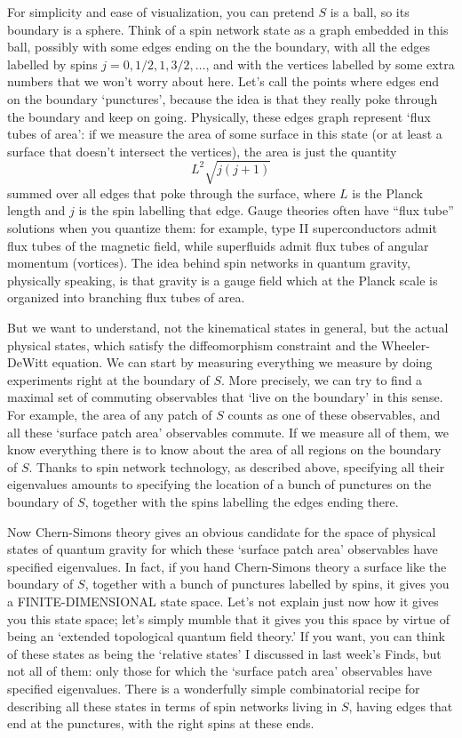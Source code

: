 \documentclass{article}
\begin{document}
For simplicity and ease of visualization, you can pretend \(S\) is a
ball, so its boundary is a sphere. Think of a spin network state as a
graph embedded in this ball, possibly with some edges ending on the the
boundary, with all the edges labelled by spins
\(j = 0,1/2,1,3/2,\ldots\), and with the vertices labelled by some extra
numbers that we won't worry about here. Let's call the points where
edges end on the boundary `punctures', because the idea is that they
really poke through the boundary and keep on going. Physically, these
edges graph represent `flux tubes of area': if we measure the area of
some surface in this state (or at least a surface that doesn't intersect
the vertices), the area is just the quantity \[L^2  \sqrt{j(j+1)}\]
summed over all edges that poke through the surface, where \(L\) is the
Planck length and \(j\) is the spin labelling that edge. Gauge theories
often have ``flux tube'' solutions when you quantize them: for example,
type II superconductors admit flux tubes of the magnetic field, while
superfluids admit flux tubes of angular momentum (vortices). The idea
behind spin networks in quantum gravity, physically speaking, is that
gravity is a gauge field which at the Planck scale is organized into
branching flux tubes of area.

But we want to understand, not the kinematical states in general, but
the actual physical states, which satisfy the diffeomorphism constraint
and the Wheeler-DeWitt equation. We can start by measuring everything we
measure by doing experiments right at the boundary of \(S\). More
precisely, we can try to find a maximal set of commuting observables
that `live on the boundary' in this sense. For example, the area of any
patch of \(S\) counts as one of these observables, and all these
`surface patch area' observables commute. If we measure all of them, we
know everything there is to know about the area of all regions on the
boundary of \(S\). Thanks to spin network technology, as described
above, specifying all their eigenvalues amounts to specifying the
location of a bunch of punctures on the boundary of \(S\), together with
the spins labelling the edges ending there.

Now Chern-Simons theory gives an obvious candidate for the space of
physical states of quantum gravity for which these `surface patch area'
observables have specified eigenvalues. In fact, if you hand
Chern-Simons theory a surface like the boundary of \(S\), together with
a bunch of punctures labelled by spins, it gives you a
FINITE-DIMENSIONAL state space. Let's not explain just now how it gives
you this state space; let's simply mumble that it gives you this space
by virtue of being an `extended topological quantum field theory.' If
you want, you can think of these states as being the `relative states' I
discussed in last week's Finds, but not all of them: only those for
which the `surface patch area' observables have specified eigenvalues.
There is a wonderfully simple combinatorial recipe for describing all
these states in terms of spin networks living in \(S\), having edges
that end at the punctures, with the right spins at these ends.
\end{document}

